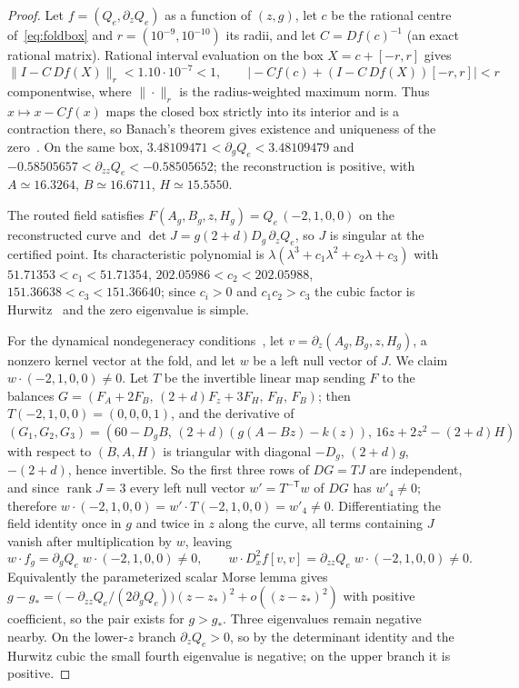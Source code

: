 \documentclass[11pt,a4paper]{article}
\theoremstyle{plain}
\theoremstyle{definition}
\theoremstyle{remark}
\begin{document}
\begin{proof}
Let $f=(Q_e,\partial_zQ_e)$ as a function of $(z,g)$, let $c$ be the rational centre of~\eqref{eq:foldbox} and $r=(10^{-9},10^{-10})$ its radii, and let $C=Df(c)^{-1}$ (an exact rational matrix). Rational interval evaluation on the box $X=c+[-r,r]$ gives
\[
\|I-C\,Df(X)\|_r<1.10\cdot10^{-7}<1,\qquad\bigl|-Cf(c)+(I-C\,Df(X))[-r,r]\bigr|<r
\]
componentwise, where $\|\cdot\|_r$ is the radius-weighted maximum norm. Thus $x\mapsto x-Cf(x)$ maps the closed box strictly into its interior and is a contraction there, so Banach's theorem gives existence and uniqueness of the zero~\cite{moore1977,rump1983}. On the same box, $3.48109471<\partial_gQ_e<3.48109479$ and $-0.58505657<\partial_{zz}Q_e<-0.58505652$; the reconstruction is positive, with $A\simeq16.3264$, $B\simeq16.6711$, $H\simeq15.5550$.

The routed field satisfies $F(A_g,B_g,z,H_g)=Q_e\,(-2,1,0,0)$ on the reconstructed curve and $\det J=g(2+d)D_g\,\partial_zQ_e$, so $J$ is singular at the certified point. Its characteristic polynomial is $\lambda(\lambda^3+c_1\lambda^2+c_2\lambda+c_3)$ with $51.71353<c_1<51.71354$, $202.05986<c_2<202.05988$, $151.36638<c_3<151.36640$; since $c_i>0$ and $c_1c_2>c_3$ the cubic factor is Hurwitz~\cite{gantmacher1959} and the zero eigenvalue is simple.

For the dynamical nondegeneracy conditions~\cite{sotomayor1973,kuznetsov2004}, let $v=\partial_z(A_g,B_g,z,H_g)$, a nonzero kernel vector at the fold, and let $w$ be a left null vector of $J$. We claim $w\cdot(-2,1,0,0)\ne0$. Let $T$ be the invertible linear map sending $F$ to the balances $G=(F_A+2F_B,\,(2+d)F_z+3F_H,\,F_H,\,F_B)$; then $T(-2,1,0,0)=(0,0,0,1)$, and the derivative of $(G_1,G_2,G_3)=(60-D_gB,\,(2+d)(g(A-Bz)-k(z)),\,16z+2z^2-(2+d)H)$ with respect to $(B,A,H)$ is triangular with diagonal $-D_g$, $(2+d)g$, $-(2+d)$, hence invertible. So the first three rows of $DG=TJ$ are independent, and since $\operatorname{rank}J=3$ every left null vector $w'=T^{-\mathsf T}w$ of $DG$ has $w'_4\ne0$; therefore $w\cdot(-2,1,0,0)=w'\cdot T(-2,1,0,0)=w'_4\ne0$. Differentiating the field identity once in $g$ and twice in $z$ along the curve, all terms containing $J$ vanish after multiplication by $w$, leaving
\[
w\cdot f_g=\partial_gQ_e\;w\cdot(-2,1,0,0)\ne0,\qquad w\cdot D^2_xf[v,v]=\partial_{zz}Q_e\;w\cdot(-2,1,0,0)\ne0 .
\]
Equivalently the parameterized scalar Morse lemma gives $g-g_*=\bigl(-\partial_{zz}Q_e/(2\partial_gQ_e)\bigr)(z-z_*)^2+o((z-z_*)^2)$ with positive coefficient, so the pair exists for $g>g_*$. Three eigenvalues remain negative nearby. On the lower-$z$ branch $\partial_zQ_e>0$, so by the determinant identity and the Hurwitz cubic the small fourth eigenvalue is negative; on the upper branch it is positive.
\end{proof}
\end{document}
